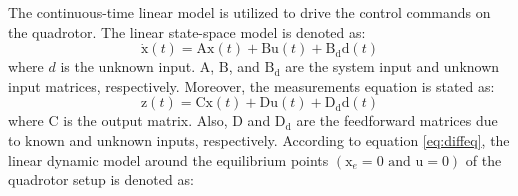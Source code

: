 \documentclass[conference]{IEEEtran}
\begin{document}
The continuous-time linear model is utilized to drive the control commands on the quadrotor. The linear state-space model is denoted as:
\begin{equation}
	\boldsymbol{\dot{\mathrm{x}}}(t) = \boldsymbol{\mathrm{Ax}}(t) + \boldsymbol{\mathrm{Bu}}(t) + \boldsymbol{\mathrm{B_{d}d}}(t)
\end{equation}
where $d$ is the unknown input. $\boldsymbol{\mathrm{A}}$, $\boldsymbol{\mathrm{B}}$, and $\boldsymbol{\mathrm{B_d}}$ are the system input and unknown input matrices, respectively. Moreover, the measurements equation is stated as:
\begin{equation}
	\boldsymbol{{\mathrm{z}}}(t) = \boldsymbol{\mathrm{Cx}}(t) + \boldsymbol{\mathrm{Du}}(t) + \boldsymbol{\mathrm{D_{d}d}}(t)
\end{equation}
where $\boldsymbol{\mathrm{C}}$ is the output matrix. Also, $\boldsymbol{\mathrm{D}}$ and $\boldsymbol{\mathrm{D_d}}$ are the feedforward matrices due to known and unknown inputs, respectively. 
According to equation \eqref{eq:diffeq}, the linear dynamic model around the equilibrium points $(\boldsymbol{{\mathrm{x}}}_e = 0 \text{ and } \boldsymbol{{\mathrm{u}}} = 0)$ of the quadrotor setup is denoted as:
\end{document}
